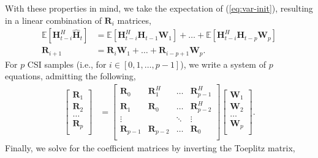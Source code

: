 With these properties in mind, we take the expectation of (\ref{eq:var-init}), 
resulting in a linear combination of $\mathbf R_i$ matrices,
\begin{align*}
\mathbb E\left[\mathbf{H}_{t-i}^H\mathbf{\hat H}_{t}\right] &= \mathbb E\left[\mathbf{H}_{t-i}^H\mathbf{H}_{t-1} \mathbf W_{1}\right] + \dots + \mathbb E\left[\mathbf{H}_{t-i}^H\mathbf{H}_{t-p} \mathbf W_{p}\right] \\
\mathbf R_{i+1} &= \mathbf{R}_{i} \mathbf W_{1} + \dots + \mathbf{R}_{i-p+1} \mathbf W_{p}. 
\end{align*}
For $p$ CSI samples (i.e., for $i \in [0, 1, \dots, p-1]$), we write a system of $p$ equations, admitting the following,
\begin{align}
  \begin{bmatrix}
    \mathbf R_{1} \\ \mathbf R_{2} \\ \dots \\ \mathbf R_{p} \\
  \end{bmatrix}
  &= 
  \begin{bmatrix}
    \mathbf R_{0} & \mathbf R_1^H & \dots  & \mathbf R_{p-1}^H \\
    \mathbf R_{1} & \mathbf R_0   & \dots  & \mathbf R_{p-2}^H \\
    \vdots      &         & \ddots & \vdots \\
    \mathbf R_{p-1} & \mathbf R_{p-2}   & \dots  & \mathbf R_{0} \\
  \end{bmatrix}
  \begin{bmatrix}
    \mathbf W_{1} \\ \mathbf W_{2} \\ \dots \\ \mathbf W_{p} \\
  \end{bmatrix}. \label{eq:toep}
\end{align}
Finally, we solve for the coefficient matrices by inverting the Toeplitz matrix,
